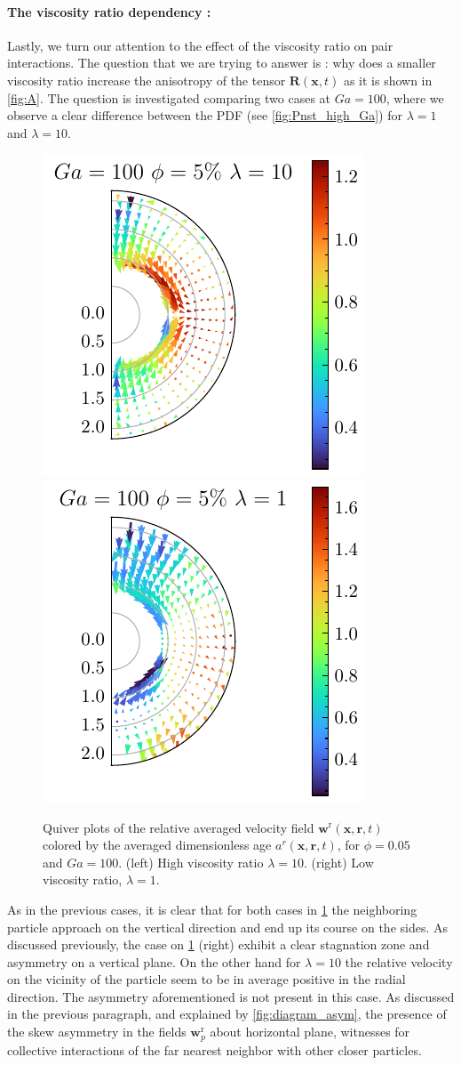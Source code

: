 \paragraph*{The viscosity ratio dependency :}
Lastly, we turn our attention to the effect of the viscosity ratio on pair interactions.
The question that we are trying to answer is : why does a smaller viscosity ratio increase the anisotropy of the tensor $\textbf{R}(\textbf{x},t)$ as it is shown in \ref{fig:A}. 
The question is investigated comparing two cases at $Ga = 100$, where we observe a clear difference between the PDF (see \ref{fig:Pnst_high_Ga}) for $\lambda = 1$ and  $\lambda = 10$.
\begin{figure}[h!]
    \centering
    \includegraphics[height=0.35\textwidth]{image/HOMOGENEOUS_NEW/Dist/U_rel_l_10_Ga_100_PHI_5.pdf}
    \includegraphics[height=0.35\textwidth]{image/HOMOGENEOUS_NEW/Dist/U_rel_l_1_Ga_100_PHI_5.pdf}
    \caption{Quiver plots of the relative averaged velocity field $\textbf{w}^\text{r}(\textbf{x},\textbf{r},t)$ colored by the averaged dimensionless age $a^r(\textbf{x},\textbf{r},t)$, for $\phi = 0.05$ and $Ga = 100$. 
    (left) High viscosity ratio $\lambda = 10$.
    (right) Low viscosity ratio, $\lambda = 1$. }
    \label{fig:Why_l_matter}
\end{figure}
As in the previous cases, it is clear that for both cases in \ref{fig:Why_l_matter} the neighboring particle approach on the vertical direction and end up its course on the sides.
As discussed previously, the case on \ref{fig:Why_l_matter} (right) exhibit a clear stagnation zone and asymmetry on a vertical plane. 
On the other hand for $\lambda =10$ the relative velocity on the vicinity of the particle seem to be in average positive in the radial direction. 
The asymmetry aforementioned is not present in this case. 
As discussed in the previous paragraph, and explained by \ref{fig:diagram_asym}, the presence of the skew asymmetry in the fields $\textbf{w}_p^\text{r}$ about horizontal plane, witnesses for collective interactions of the far nearest neighbor with other closer particles. 

